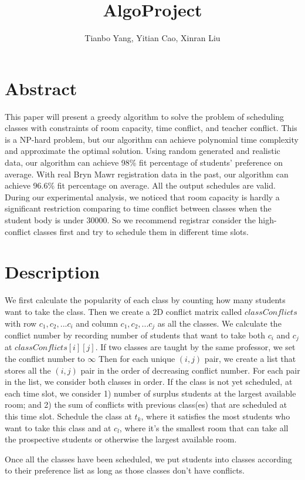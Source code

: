 \documentclass[11pt, oneside]{article}   	%
\title{AlgoProject}
\author{Tianbo Yang, Yitian Cao, Xinran Liu}
\begin{document}
\maketitle

\section{Abstract}
This paper will present a greedy algorithm to solve the problem of scheduling classes with constraints of room capacity, time conflict, and teacher conflict. This is a NP-hard problem, but our algorithm can achieve polynomial time complexity and approximate the optimal solution. Using random generated and realistic data, our algorithm can achieve 98\% fit percentage of students' preference on average. With real Bryn Mawr registration data in the past, our algorithm can achieve 96.6\% fit percentage on average. All the output schedules are valid. During our experimental analysis, we noticed that room capacity is hardly a significant restriction comparing to time conflict between classes when the student body is under 30000. So we recommend registrar consider the high-conflict classes first and try to schedule them in different time slots.   

\section{Description}
We first calculate the popularity of each class by counting how many students want to take the class. Then we create a 2D conflict matrix called $classConflicts$ with row $c_1,c_2,...c_i$ and column $c_1,c_2,...c_j$ as all the classes. We calculate the conflict number by recording number of students that want to take both $c_i$ and $c_j$ at $classConflicts[i][j]$. If two classes are taught by the same professor, we set the conflict number to $\infty$ Then for each unique $(i,j)$ pair, we create a list that stores all the $(i,j)$ pair in the order of decreasing conflict number. For each pair in the list, we consider both classes in order. If the class is not yet scheduled, at each time slot, we consider 1) number of surplus students at the largest available room; and 2) the sum of conflicts with previous class(es) that are scheduled at this time slot. Schedule the class at $t_k$, where it satisfies the most students who want to take this class and at $c_l$, where it's the smallest room that can take all the prospective students or otherwise the largest available room. 

Once all the classes have been scheduled, we put students into classes according to their preference list as long as those classes don't have conflicts. 
\end{document}
